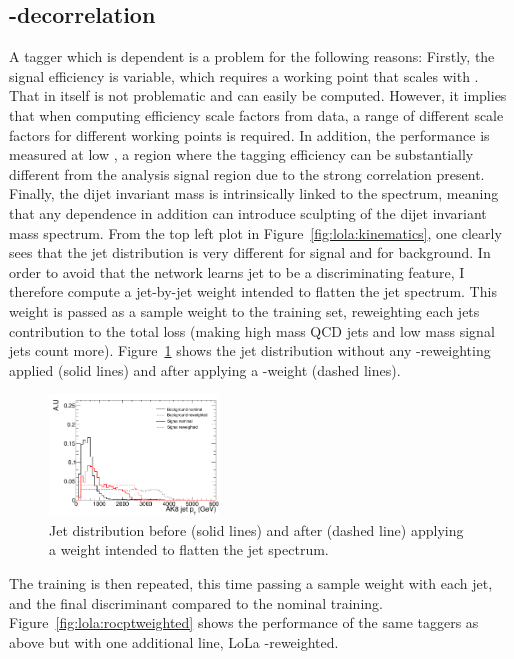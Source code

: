 \subsection{\PT-decorrelation}
A tagger which is \PT dependent is a problem for the following reasons: Firstly, the signal efficiency is variable, which requires a working point that scales with \PT. That in itself is not problematic and can easily be computed. However, it implies that when computing efficiency scale factors from data, a range of different scale factors for different working points is required. In addition, the performance is measured at low \PT, a region where the tagging efficiency can be substantially different from the analysis signal region due to the strong \PT correlation present. Finally, the dijet invariant mass is intrinsically linked to the \PT spectrum, meaning that any \PT dependence in addition can introduce sculpting of the dijet invariant mass spectrum.\newline
From the top left plot in Figure~\ref{fig:lola:kinematics}, one clearly sees that the jet \PT distribution is very different for signal and for background. In order to avoid that the network learns jet \PT to be a discriminating feature, I therefore compute a jet-by-jet weight intended to flatten the jet \PT spectrum. This weight is passed as a sample weight to the training set, reweighting each jets contribution to the total loss (making high mass QCD jets and low mass signal jets count more). Figure~\ref{fig:lola:ptweight} shows the jet \PT distribution without any \PT-reweighting applied (solid lines) and after applying a \PT-weight (dashed lines).
\begin{figure}[h!]
\centering
\includegraphics[width=0.4\textwidth]{figures/vtagging/AN-18-099/input/pt_reweighted/postWeight.png}
\caption{Jet \PT distribution before (solid lines) and after (dashed line) applying a weight intended to flatten the jet \PT spectrum.}
\label{fig:lola:ptweight}
\end{figure}
The training is then repeated, this time passing a sample weight with each jet, and the final discriminant compared to the nominal training. Figure~\ref{fig:lola:rocptweighted} shows the performance of the same taggers as above but with one additional line, LoLa \PT-reweighted.
